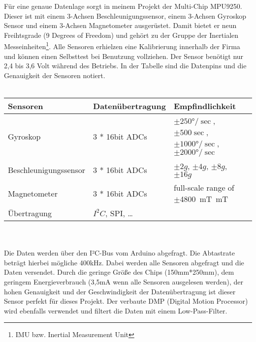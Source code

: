 Für eine genaue Datenlage sorgt in meinem Projekt der Multi-Chip MPU9250. Dieser ist mit 
einem 3-Achsen Beschleunigungssensor, einem 3-Achsen Gyroskop Sensor und einem 3-Achsen 
Magnetometer ausgerüstet. Damit bietet er neun Freihtsgrade (9 Degrees of Freedom) und gehört zu der Gruppe der 
Inertialen Messeinheiten\footnote{IMU bzw. Inertial Measurement Unit}.
Alle Sensoren erhielzen eine Kalibrierung innerhalb der 
Firma und können einen Selbsttest bei Benutzung vollziehen. Der Sensor benötigt nur 2,4 bis 3,6 Volt während 
des Betriebs. In der Tabelle sind die Datenpins und die Genauigkeit der Sensoren notiert.\\
\\
\begin{tabularx}{0.8\textwidth}{l|X|XX}
Sensoren & Datenübertragung & Empfindlichkeit                                     \\
\hline
Gyroskop & 3 * 16bit ADCs & $\pm250°/\sec$, $\pm500\sec$, $\pm1000°/\sec$, $\pm2000°/\sec$\\ 
\hline
Beschleunigungssensor & 3 * 16bit ADCs & $\pm2g$, $\pm4g$, $\pm8g$, $\pm16g$\\
\hline
Magnetometer & 3 * 16bit ADCs & full-scale range of $\pm$\SI{4800}{\milli\tesla\meter}T \\
\hline
Übertragung & $I^2C$, SPI, \dots & \\
\end{tabularx}
\\
\\
Die Daten werden über den I²C-Bus vom Arduino abgefragt. Die Abtastrate beträgt hierbei 
mögliche 400kHz. Dabei werden alle Sensoren abgefragt und die Daten versendet.
Durch die geringe Größe des Chips (150mm*250mm), dem geringem Energieverbrauch (3,5mA wenn 
alle Sensoren ausgelesen werden), der hohen Genauigkeit und der Geschwindigkeit der 
Datenübertragung ist dieser Sensor perfekt für dieses Projekt. Der verbaute
DMP (Digital Motion Processor) wird ebenfalls verwendet und filtert die Daten mit einem
Low-Pass-Filter.

